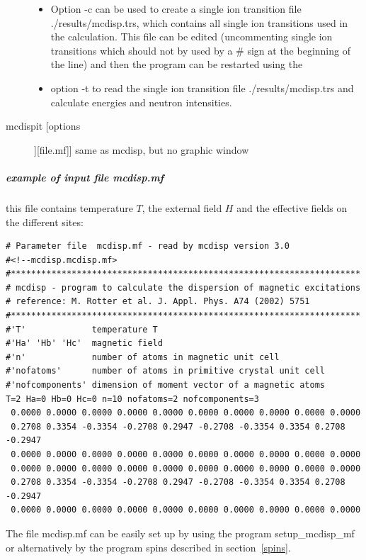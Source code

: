 \begin{description}
\begin{itemize}
				\item Option {\prg -c}  can be used to create  a single ion
				transition file {\prg ./results/mcdisp.trs}, which contains
				all single ion transitions used in the calculation. This file can
				be edited (uncommenting single ion transitions which should not
				by used by a \# sign at the beginning of the line)
				and then the program can be restarted using the 
				\item  option {\prg -t} to
				read the single ion transition file {\prg ./results/mcdisp.trs} and
				calculate energies and neutron intensities.
				\end{itemize}
\item [\prg mcdispit [options]][file.mf]]  same as {\prg mcdisp}, but no graphic window
\end{description} 

\subparagraph{example of input file {\prg  mcdisp.mf}}
this file contains temperature $T$, the external field $H$ and
the effective fields on the different sites:

\begin{verbatim}
# Parameter file  mcdisp.mf - read by mcdisp version 3.0
#<!--mcdisp.mcdisp.mf>
#*********************************************************************
# mcdisp - program to calculate the dispersion of magnetic excitations
# reference: M. Rotter et al. J. Appl. Phys. A74 (2002) 5751
#*********************************************************************
#'T'             temperature T
#'Ha' 'Hb' 'Hc'  magnetic field
#'n'             number of atoms in magnetic unit cell
#'nofatoms'      number of atoms in primitive crystal unit cell
#'nofcomponents' dimension of moment vector of a magnetic atoms
T=2 Ha=0 Hb=0 Hc=0 n=10 nofatoms=2 nofcomponents=3
 0.0000 0.0000 0.0000 0.0000 0.0000 0.0000 0.0000 0.0000 0.0000 0.0000
 0.2708 0.3354 -0.3354 -0.2708 0.2947 -0.2708 -0.3354 0.3354 0.2708 -0.2947
 0.0000 0.0000 0.0000 0.0000 0.0000 0.0000 0.0000 0.0000 0.0000 0.0000
 0.0000 0.0000 0.0000 0.0000 0.0000 0.0000 0.0000 0.0000 0.0000 0.0000
 0.2708 0.3354 -0.3354 -0.2708 0.2947 -0.2708 -0.3354 0.3354 0.2708 -0.2947
 0.0000 0.0000 0.0000 0.0000 0.0000 0.0000 0.0000 0.0000 0.0000 0.0000
\end{verbatim}

The file {\prg mcdisp.mf} can be easily set up by using the program {\prg %
setup\_mcdisp\_mf} or alternatively by the program {\prg spins} 
described in section~\ref{spins}.

